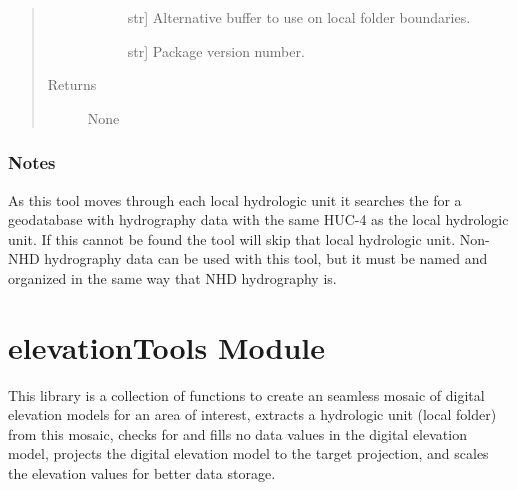 \documentclass[letterpaper,10pt,english]{sphinxmanual}
\begin{document}
\begin{fulllineitems}
\begin{quote}
\begin{description}
\begin{description}
\item[{}] \leavevmode{[}str{]}
Alternative buffer to use on local folder boundaries.

\item[{}] \leavevmode{[}str{]}
Package version number.

\end{description}

\item[{Returns}] \leavevmode\begin{description}
\item[{None}] \leavevmode
\end{description}

\end{description}\end{quote}
\subsubsection*{Notes}

As this tool moves through each local hydrologic unit it searches the  for a geodatabase with hydrography data with the same HUC-4 as the local hydrologic unit. If this cannot be found the tool will skip that local hydrologic unit. Non-NHD hydrography data can be used with this tool, but it must be named and organized in the same way that NHD hydrography is.

\end{fulllineitems}



\section{elevationTools Module}
\label{\detokenize{elevationTools:module-elevationTools}}\label{\detokenize{elevationTools:elevationtools-module}}\label{\detokenize{elevationTools::doc}}
This library is a collection of functions to create an seamless mosaic of digital elevation models for an area of interest, extracts a hydrologic unit (local folder) from this mosaic, checks for and fills no data values in the digital elevation model, projects the digital elevation model to the target projection, and scales the elevation values for better data storage.
\end{document}
